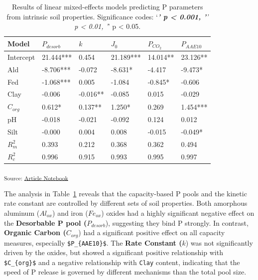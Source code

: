 \documentclass[
  a4paper,
]{article}
\begin{document}
\begin{longtable}[]{@{}llllll@{}}

\caption{\label{tbl-soil-prop-models}Results of linear mixed-effects
models predicting P parameters from intrinsic soil properties.
Significance codes: `\emph{\textbf{' p \textless{} 0.001, '}' p
\textless{} 0.01, '}' p \textless{} 0.05.}

\tabularnewline

\toprule\noalign{}
Model & \(P_{desorb}\) & \(k\) & \(J_0\) & \(P_{CO_2}\) &
\(P_{AAE10}\) \\
\midrule\noalign{}
\endhead
\bottomrule\noalign{}
\endlastfoot
Intercept & 21.444*** & 0.454 & 21.189*** & 14.014** & 23.126** \\
Ald & -8.706*** & -0.072 & -8.631* & -4.417 & -9.473* \\
Fed & -1.068*** & 0.005 & -1.084 & -0.845* & -0.606 \\
Clay & -0.006 & -0.016** & -0.085 & 0.015 & -0.029 \\
\(C_{org}\) & 0.612* & 0.137** & 1.250* & 0.269 & 1.454*** \\
pH & -0.018 & -0.021 & -0.092 & 0.124 & 0.012 \\
Silt & -0.000 & 0.004 & 0.008 & -0.015 & -0.049* \\
\(R^2_m\) & 0.393 & 0.212 & 0.368 & 0.362 & 0.494 \\
\(R^2_c\) & 0.996 & 0.915 & 0.993 & 0.995 & 0.997 \\

\end{longtable}

\textsubscript{Source:
\href{https://Andrapodon.github.io/Master-Thesis-P-kinetics/index.qmd.html}{Article
Notebook}}

The analysis in Table~\ref{tbl-soil-prop-models} reveals that the
capacity-based P pools and the kinetic rate constant are controlled by
different sets of soil properties. Both amorphous aluminum (\(Al_{ox}\))
and iron (\(Fe_{ox}\)) oxides had a highly significant negative effect
on the \textbf{Desorbable P pool (}\(P_{desorb}\)), suggesting they bind
P strongly. In contrast, \textbf{Organic Carbon (}\(C_{org}\)) had a
significant positive effect on all capacity measures, especially
\texttt{\$P\_\{AAE10\}\$}. The \textbf{Rate Constant (}\(k\)) was not
significantly driven by the oxides, but showed a significant positive
relationship with \texttt{\$C\_\{org\}\$} and a negative relationship
with \texttt{Clay} content, indicating that the speed of P release is
governed by different mechanisms than the total pool size.
\end{document}
